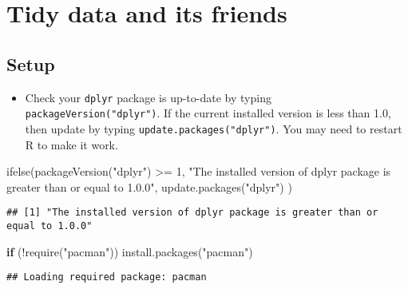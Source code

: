 \documentclass[
]{book}
\newenvironment{Shaded}{\begin{snugshade}}{\end{snugshade}}
\newcommand{\ControlFlowTok}[1]{\textcolor[rgb]{0.13,0.29,0.53}{\textbf{#1}}}
\newcommand{\DecValTok}[1]{\textcolor[rgb]{0.00,0.00,0.81}{#1}}
\newcommand{\FunctionTok}[1]{\textcolor[rgb]{0.00,0.00,0.00}{#1}}
\newcommand{\NormalTok}[1]{#1}
\newcommand{\SpecialCharTok}[1]{\textcolor[rgb]{0.00,0.00,0.00}{#1}}
\newcommand{\StringTok}[1]{\textcolor[rgb]{0.31,0.60,0.02}{#1}}
\providecommand{\tightlist}{%
  \setlength{\itemsep}{0pt}\setlength{\parskip}{0pt}}
\begin{document}
\hypertarget{tidy_data}{%
\chapter{Tidy data and its friends}\label{tidy_data}}

\hypertarget{setup-2}{%
\section{Setup}\label{setup-2}}

\begin{itemize}
\tightlist
\item
  Check your \texttt{dplyr} package is up-to-date by typing \texttt{packageVersion("dplyr")}. If the current installed version is less than 1.0, then update by typing \texttt{update.packages("dplyr")}. You may need to restart R to make it work.
\end{itemize}

\begin{Shaded}
\begin{Highlighting}[]
\FunctionTok{ifelse}\NormalTok{(}\FunctionTok{packageVersion}\NormalTok{(}\StringTok{"dplyr"}\NormalTok{) }\SpecialCharTok{\textgreater{}=} \DecValTok{1}\NormalTok{,}
  \StringTok{"The installed version of dplyr package is greater than or equal to 1.0.0"}\NormalTok{, }\FunctionTok{update.packages}\NormalTok{(}\StringTok{"dplyr"}\NormalTok{)}
\NormalTok{)}
\end{Highlighting}
\end{Shaded}

\begin{verbatim}
## [1] "The installed version of dplyr package is greater than or equal to 1.0.0"
\end{verbatim}

\begin{Shaded}
\begin{Highlighting}[]
\ControlFlowTok{if}\NormalTok{ (}\SpecialCharTok{!}\FunctionTok{require}\NormalTok{(}\StringTok{"pacman"}\NormalTok{)) }\FunctionTok{install.packages}\NormalTok{(}\StringTok{"pacman"}\NormalTok{)}
\end{Highlighting}
\end{Shaded}

\begin{verbatim}
## Loading required package: pacman
\end{verbatim}
\end{document}
